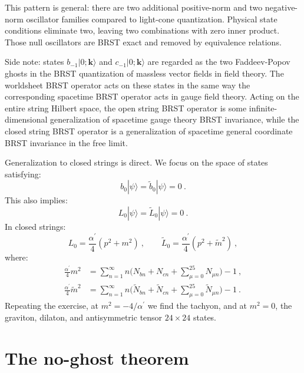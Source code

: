 This pattern is general: there are two additional positive-norm and two negative-norm oscillator families compared to light-cone quantization. Physical state conditions eliminate two, leaving two combinations with zero inner product. Those null oscillators are BRST exact and removed by equivalence relations.

Side note: states $b_{-1}|0 ; \mathbf{k}\rangle$ and $c_{-1}|0 ; \mathbf{k}\rangle$ are regarded as the two Faddeev-Popov ghosts in the BRST quantization of massless vector fields in field theory. The worldsheet BRST operator acts on these states in the same way the corresponding spacetime BRST operator acts in gauge field theory. Acting on the entire string Hilbert space, the open string BRST operator is some infinite-dimensional generalization of spacetime gauge theory BRST invariance, while the closed string BRST operator is a generalization of spacetime general coordinate BRST invariance in the free limit.

Generalization to closed strings is direct. We focus on the space of states satisfying:
\begin{equation}
b_{0}|\psi\rangle=\tilde{b}_{0}|\psi\rangle=0 \:. \label{4.3.29}
\end{equation}
This also implies:
\begin{equation}
L_{0}|\psi\rangle=\tilde{L}_{0}|\psi\rangle=0 \:. \label{4.3.30}
\end{equation}
In closed strings:
\begin{equation}
L_{0}=\frac{\alpha^{\prime}}{4} (p^{2}+m^{2}) \:, \qquad \tilde{L}_{0}=\frac{\alpha^{\prime}}{4}(p^{2}+\tilde{m}^{2}) \:, \label{4.3.31}
\end{equation}
where:
\begin{subequations} \label{4.3.32}
\begin{align} 
	\frac{\alpha^{\prime}}{4} m^{2}&=\sum_{n=1}^{\infty} n\Biggl(N_{b n}+N_{c n}+\sum_{\mu=0}^{25} N_{\mu n}\Biggr)-1 \:, \label{4.3.32a}\\
	\frac{\alpha^{\prime}}{4} \tilde{m}^{2}&=\sum_{n=1}^{\infty} n\Biggl(\tilde{N}_{b n}+\tilde{N}_{c n}+\sum_{\mu=0}^{25} \tilde{N}_{\mu n}\Biggr)-1 \:. \label{4.3.32b}
\end{align}
\end{subequations}
Repeating the exercise, at $m^{2}=-4 / \alpha^{\prime}$ we find the tachyon, and at $m^{2}=0$, the graviton, dilaton, and antisymmetric tensor $24 \times 24$ states.

\section{\texorpdfstring{The no-ghost theorem}{The no-ghost theorem}} \label{sec:4.4}

